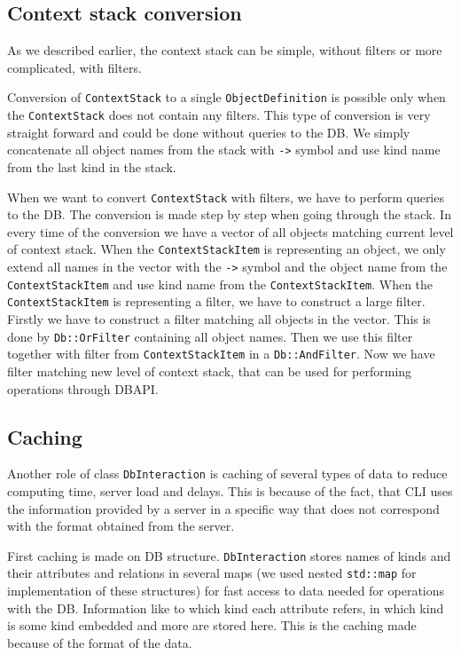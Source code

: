 \documentclass[deska]{subfiles}
\begin{document}
\subsection{Context stack conversion}

As we described earlier, the context stack can be simple, without filters or more complicated, with filters.

Conversion of {\tt ContextStack} to a single {\tt ObjectDefinition} is possible only when the {\tt ContextStack} does
not contain any filters. This type of conversion is very straight forward and could be done without queries to the DB.
We simply concatenate all object names from the stack with {\tt ->} symbol and use kind name from the last kind in the stack.

When we want to convert {\tt ContextStack} with filters, we have to perform queries to the DB. The conversion is made
step by step when going through the stack. In every time of the conversion we have a vector of all objects matching current
level of context stack. When the {\tt ContextStackItem} is representing an object, we only extend all names in the vector
with the {\tt ->} symbol and the object name from the {\tt ContextStackItem} and use kind name from the {\tt ContextStackItem}.
When the {\tt ContextStackItem} is representing a filter, we have to construct a large filter. Firstly we have to construct
a filter matching all objects in the vector. This is done by {\tt Db::OrFilter} containing all object names. Then we use
this filter together with filter from {\tt ContextStackItem} in a {\tt Db::AndFilter}. Now we have filter matching new
level of context stack, that can be used for performing operations through DBAPI.

\subsection{Caching}

Another role of class {\tt DbInteraction} is caching of several types of data to reduce computing time, server load and delays.
This is because of the fact, that CLI uses the information provided by a server in a specific way that does not correspond
with the format obtained from the server.

First caching is made on DB structure. {\tt DbInteraction} stores names of kinds and their attributes and relations in several maps
(we used nested {\tt std::map} for implementation of these structures) for fast access to data needed for operations with
the DB. Information like to which kind each attribute refers, in which kind is some kind embedded and more are stored
here. This is the caching made because of the format of the data.
\end{document}
